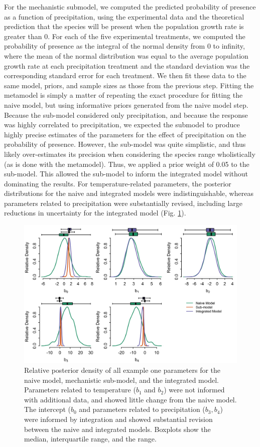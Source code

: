\documentclass[11pt]{article}
\begin{document}
For the mechanistic submodel, we computed the predicted probability of presence as a function of precipitation, using the experimental data and the theoretical prediction that the species will be present when the population growth rate is greater than 0.
For each of the five experimental treatments, we computed the probability of presence as the integral of the normal density from 0 to infinity, where the mean of the normal distribution was equal to the average population growth rate at each precipitation treatment and the standard deviation was the corresponding standard error for each treatment.
We then fit these data to the same model, priors, and sample sizes as those from the previous step.
Fitting the metamodel is simply a matter of repeating the exact procedure for fitting the naive model, but using informative priors generated from the naive model step.
Because the sub-model considered only precipitation, and because the response was highly correlated to precipitation, we expected the submodel to produce highly precise estimates of the parameters for the effect of precipitation on the probability of presence.
However, the sub-model was quite simplistic, and thus likely over-estimates its precision when considering the species range wholistically (as is done with the metamodel).
Thus, we applied a prior weight of 0.05 to the sub-model.
This allowed the sub-model to inform the integrated model without dominating the results.
For temperature-related parameters, the posterior distributions for the naive and integrated models were indistinguishable, whereas parameters related to precipitation were substantially revised, including large reductions in uncertainty for the integrated model (Fig. \ref{fig:ex1params}).

\begin{figure}
\includegraphics[width=6.5in]{figs/ex1_params.png}
\caption{Relative posterior density of all example one parameters for the naive model, mechanistic sub-model, and the integrated model.
Parameters related to temperature ($b_1$ and $b_2$) were not informed with additional data, and showed little change from the naive model.
The intercept ($b_0$ and parameters related to precipitation ($b_3, b_4$) were informed by integration and showed substantial revision between the naive and integrated models.
Boxplots show the median, interquartile range, and the range.}
\label{fig:ex1params}
\end{figure}
\end{document}

